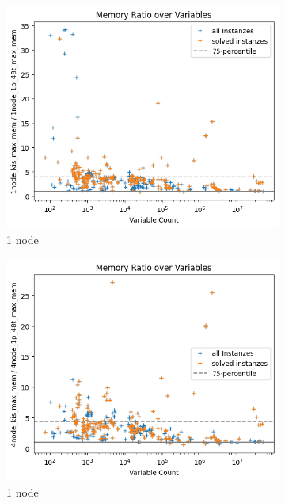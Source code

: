 \documentclass[12pt,a4paper,twoside]{scrartcl}
\numberwithin{equation}{section}
\begin{document}
\begin{figure}
  \center
  \begin{subfigure}[c]{.4\textwidth}
    \center
    \includegraphics[scale=.3]{plots/1node_compare/mem_ratio_over_vars.png}
    \caption{1 node}
  \end{subfigure}
  \begin{subfigure}[c]{.4\textwidth}
    \center
    \includegraphics[scale=.3]{plots/4node_compare/mem_ratio_over_vars.png}
    \caption{1 node}
  \end{subfigure}
  \begin{subfigure}[c]{.4\textwidth}

\end{subfigure}
\end{figure}
\end{document}
